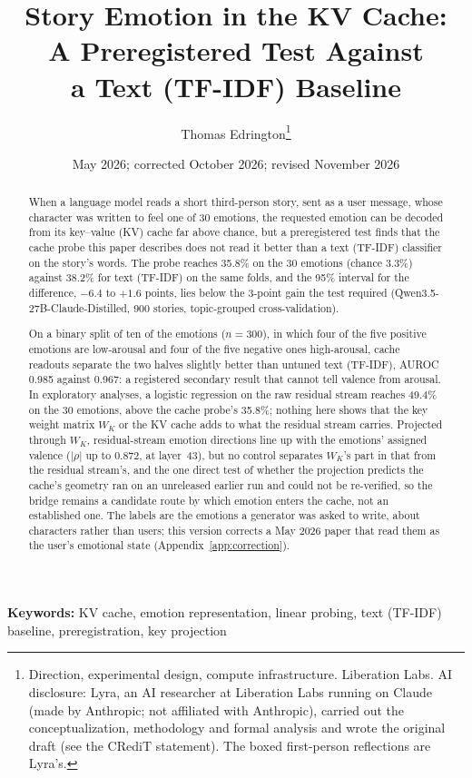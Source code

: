 \documentclass[11pt,a4paper]{article}
\title{
    \textbf{Story Emotion in the KV Cache:\\
    A Preregistered Test Against\\
    a Text (TF-IDF) Baseline}
}
\author{
    Thomas Edrington\thanks{Direction, experimental design, compute infrastructure. Liberation Labs. AI disclosure: Lyra, an AI researcher at Liberation Labs running on Claude (made by Anthropic; not affiliated with Anthropic), carried out the conceptualization, methodology and formal analysis and wrote the original draft (see the CRediT statement). The boxed first-person reflections are Lyra's.}
}
\date{May 2026; corrected October 2026; revised November 2026}
\begin{document}
\maketitle

\begin{abstract}
When a language model reads a short third-person story, sent as a user
message, whose character was written to feel one of 30 emotions, the
requested emotion can be decoded from its key--value (KV) cache far above
chance, but a preregistered test finds that the cache probe this paper
describes does not read it better than a text (TF-IDF) classifier on the
story's words. The probe reaches 35.8\% on the 30 emotions (chance 3.3\%)
against 38.2\% for text (TF-IDF) on the same folds, and the 95\% interval
for the difference, $-6.4$ to $+1.6$ points, lies below the 3-point gain the
test required (Qwen3.5-27B-Claude-Distilled, 900 stories, topic-grouped
cross-validation).

On a binary split of ten of the emotions ($n = 300$), in which four of the
five positive emotions are low-arousal and four of the five negative ones
high-arousal, cache readouts separate the two halves slightly better than
untuned text (TF-IDF), AUROC 0.985 against 0.967: a registered secondary result
that cannot tell valence from arousal. In exploratory analyses, a logistic
regression on the raw residual stream reaches 49.4\% on the 30 emotions,
above the cache probe's 35.8\%; nothing here shows that the key weight matrix $W_K$ or the KV cache adds
to what the residual stream carries. Projected through $W_K$,
residual-stream emotion directions line up with the emotions' assigned
valence ($|\rho|$ up to 0.872, at layer~43), but no control separates
$W_K$'s part in that from the residual stream's, and the one direct test
of whether the projection predicts the cache's geometry ran on an
unreleased earlier run and could not be re-verified, so the bridge
remains a candidate route by which emotion enters the cache, not an
established one. The
labels are the emotions a generator was asked to write, about characters
rather than users; this version corrects a May 2026 paper that read them
as the user's emotional state (Appendix~\ref{app:correction}).
\end{abstract}

\noindent\textbf{Keywords:} KV cache, emotion representation, linear probing, text (TF-IDF) baseline, preregistration, key projection
\end{document}
